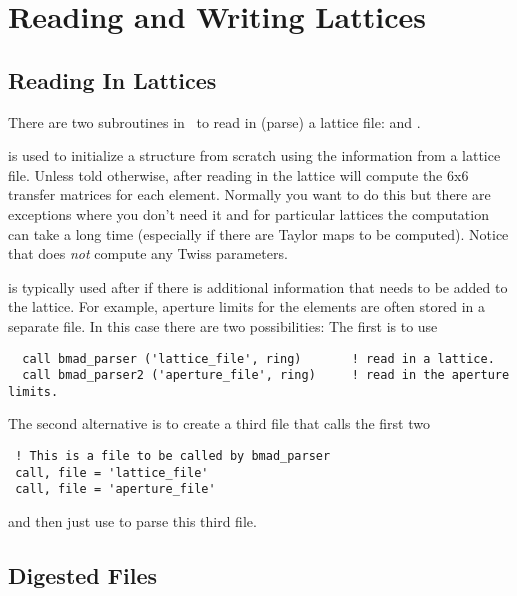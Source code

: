 \chapter{Reading and Writing Lattices}

\section{Reading In Lattices}

There are two subroutines in \bmad\ to read in (parse) a lattice
file:  and .

 is used to initialize a 
structure from scratch using the information from a lattice
file. Unless told otherwise, after reading in the lattice
 will compute the 6x6 transfer matrices for each
element. Normally you want to do this but there are exceptions where
you don't need it and for particular lattices the computation can take
a long time (especially if there are Taylor maps to be
computed). Notice that  does {\em not} compute any
Twiss parameters.

 is typically used after  if there is
additional information that needs to be added to the lattice. For
example, aperture limits for the elements are often stored in a
separate file. In this case there are two possibilities: The first is
to use 
\begin{verbatim}
  call bmad_parser ('lattice_file', ring)       ! read in a lattice.
  call bmad_parser2 ('aperture_file', ring)     ! read in the aperture limits.
\end{verbatim}
The second alternative is to create a third file that calls the first two
\begin{verbatim}
 ! This is a file to be called by bmad_parser
 call, file = 'lattice_file'
 call, file = 'aperture_file'
\end{verbatim}
and then just use  to parse this third file.


\section{Digested Files}

